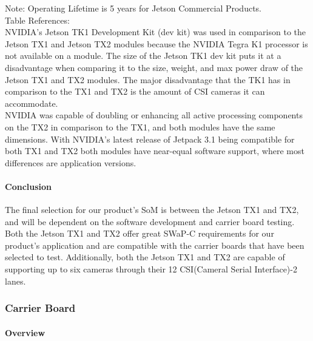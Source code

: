 \newline
\newline
\newline
Note: Operating Lifetime is 5 years for Jetson Commercial Products.\\
Table References: \cite{TK1Wiki, TK1Power, TK1Rev, JetsonFAQ, TegraK1, TK12Comp, JetsonGenius, TX1PS, TX2DS}\\

NVIDIA's Jetson TK1 Development Kit (dev kit) was used in comparison to the Jetson TX1 
and Jetson TX2 modules because the NVIDIA Tegra K1 processor is not available on a 
module. The size of the Jetson TK1 dev kit puts it at a 
disadvantage when comparing it to the size, weight, and max power draw of the Jetson 
TX1 and TX2 modules. The major disadvantage that the TK1 has in comparison to the TX1 
and TX2 is the amount of CSI cameras it can accommodate. \\

NVIDIA was capable of doubling or enhancing all active processing components on the 
TX2 in comparison to the TX1, and both modules have the same dimensions. With NVIDIA's 
latest release of Jetpack 3.1 being compatible for both TX1 and TX2 both modules 
have near-equal software support, where most differences are application 
versions\cite{TX1Wiki, TX2Wiki, JetPackRel}. \\  

\paragraph{Conclusion}

The final selection for our product's SoM is between the Jetson TX1 and TX2, and will 
be dependent on the software development and carrier board testing. Both the 
Jetson TX1 and TX2 offer great SWaP-C requirements for our product's application and 
are compatible with the carrier boards that have been selected to test. Additionally, 
both the Jetson TX1 and TX2 are capable of supporting up to six cameras through their 
12 CSI(Cameral Serial Interface)-2 lanes. \\

\subsubsection{Carrier Board}

\paragraph{Overview}

